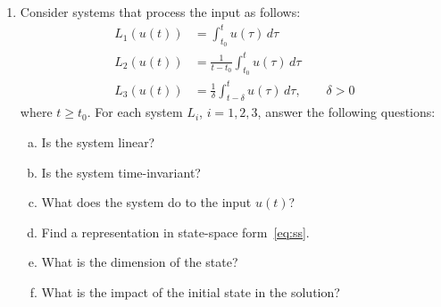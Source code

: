\documentclass[11pt]{article}
\begin{document}
\begin{enumerate}[1.]
\item Consider systems that process the input as follows:
  \begin{align*}
    L_1(u(t)) &= \int_{t_0}^t u(\tau) \, d\tau \\
    L_2(u(t)) &= \frac{1}{t - t_0} \int_{t_0}^t u(\tau) \, d\tau \\
    L_3(u(t)) &= \frac{1}{\delta} \int_{t - \delta}^t u(\tau) \, d\tau,
    \qquad \delta > 0
  \end{align*}
  where $t \geq t_0$. For each system $L_i$, $i = 1, 2, 3$, answer
  the following questions:
  \begin{enumerate}[(a)]
    \item Is the system linear?
    \item Is the system time-invariant?
    \item What does the system do to the input $u(t)$?
    \item Find a representation in state-space form~\eqref{eq:ss}. 
    \item What is the dimension of the state?
    \item What is the impact of the initial state in the solution? 
  \end{enumerate}
  

\end{enumerate}
\end{document}
